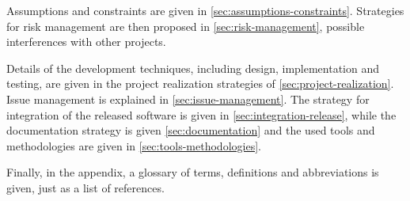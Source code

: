 Assumptions and constraints are given in \autoref{sec:assumptions-constraints}.
Strategies for risk management are then proposed in \autoref{sec:risk-management}, possible interferences with other projects.

Details of the development techniques, including design, implementation and testing, are given in the project realization strategies of \autoref{sec:project-realization}.
Issue management is explained in \autoref{sec:issue-management}.
The strategy for integration of the released software is given in \autoref{sec:integration-release}, while the documentation strategy is given \autoref{sec:documentation} and the used tools and methodologies are given in \autoref{sec:tools-methodologies}.

Finally, in the appendix, a glossary of terms, definitions and abbreviations is given, just as a list of references.
